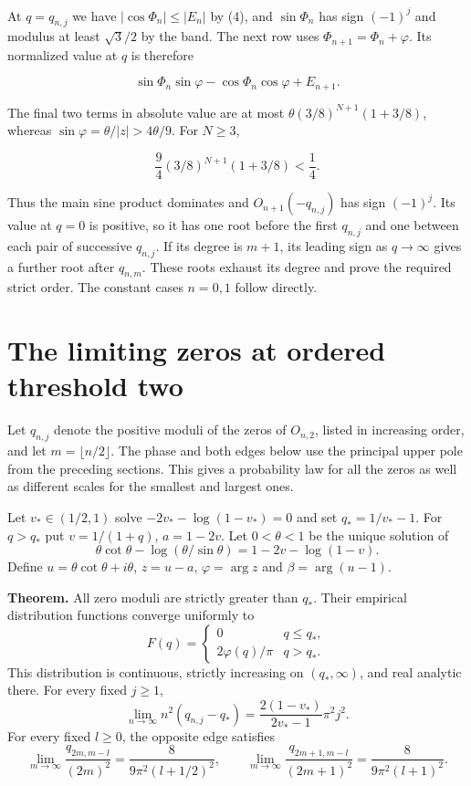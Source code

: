 \documentclass[11pt]{article}
\begin{document}
At $q=q_{n,j}$ we have $|\cos\Phi_n|\le |E_n|$ by (4), and $\sin\Phi_n$ has sign $(-1)^j$ and modulus at least $\sqrt3/2$ by the band. The next row uses $\Phi_{n+1}=\Phi_n+\varphi$. Its normalized value at $q$ is therefore

\[
\sin\Phi_n\sin\varphi-\cos\Phi_n\cos\varphi+E_{n+1}.
\]

The final two terms in absolute value are at most $\theta(3/8)^{N+1}(1+3/8)$, whereas $\sin\varphi=\theta/|z|>4\theta/9$. For $N\ge3$,

\[
\frac94 (3/8)^{N+1}(1+3/8)<\frac14.
\]

Thus the main sine product dominates and $O_{n+1}(-q_{n,j})$ has sign $(-1)^j$. Its value at $q=0$ is positive, so it has one root before the first $q_{n,j}$ and one between each pair of successive $q_{n,j}$. If its degree is $m+1$, its leading sign as $q\to\infty$ gives a further root after $q_{n,m}$. These roots exhaust its degree and prove the required strict order. The constant cases $n=0,1$ follow directly.

\section{The limiting zeros at ordered threshold two}

Let $q_{n,j}$ denote the positive moduli of the zeros of $O_{n,2}$, listed in increasing order, and let $m=\lfloor n/2\rfloor$. The phase and both edges below use the principal upper pole from the preceding sections. This gives a probability law for all the zeros as well as different scales for the smallest and largest ones.

Let $v_*\in(1/2,1)$ solve $-2v_*-\log(1-v_*)=0$ and set $q_*=1/v_*-1$. For $q>q_*$ put $v=1/(1+q)$, $a=1-2v$. Let $0<\theta<1$ be the unique solution of
\[
\theta\cot\theta-\log(\theta/\sin\theta)=1-2v-\log(1-v).
\]
Define $u=\theta\cot\theta+i\theta$, $z=u-a$, $\varphi=\arg z$ and $\beta=\arg(u-1)$.

\textbf{Theorem.} All zero moduli are strictly greater than $q_*$. Their empirical distribution functions converge uniformly to
\[
F(q)=
 \begin{cases}
 0 & q\le q_*,\\
 2\varphi(q)/\pi & q>q_* .
 \end{cases}
\]
This distribution is continuous, strictly increasing on $(q_*,\infty)$, and real analytic there. For every fixed $j\ge1$,
\[
\lim_{n\to\infty} n^2(q_{n,j}-q_*)
 =\frac{2(1-v_*)}{2v_*-1}\pi^2j^2.
\]
For every fixed $l\ge0$, the opposite edge satisfies
\[
\lim_{m\to\infty}\frac{q_{2m,m-l}}{(2m)^2}
  =\frac8{9\pi^2(l+1/2)^2},
 \qquad
 \lim_{m\to\infty}\frac{q_{2m+1,m-l}}{(2m+1)^2}
  =\frac8{9\pi^2(l+1)^2}.
\]
\end{document}
